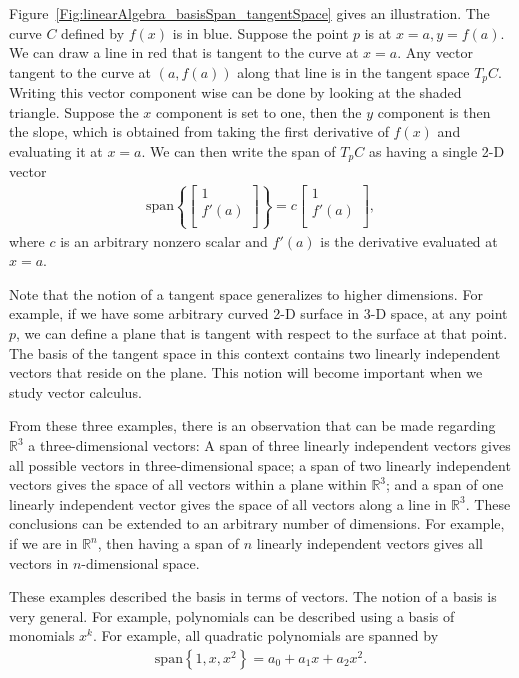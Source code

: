 Figure~\ref{Fig:linearAlgebra_basisSpan_tangentSpace} gives an illustration. The curve $C$ defined by $f(x)$ is in blue. Suppose the point $p$ is at $x = a, y = f(a)$. We can draw a line in red that is tangent to the curve at $x = a$. Any vector tangent to the curve at $(a,f(a))$ along that line is in the tangent space $T_p C$. Writing this vector component wise can be done by looking at the shaded triangle. Suppose the $x$ component is set to one, then the $y$ component is then the slope, which is obtained from taking the first derivative of $f(x)$ and evaluating it at $x = a$. We can then write the span of $T_p C$ as having a single 2-D vector
\begin{align}
  \text{span} \left\{ 
    \left[ \begin{array}{c} 1 \\  f'(a) \\ \end{array} \right] \right\}
  = c \left[ \begin{array}{c} 1 \\  f'(a) \\ \end{array} \right]  ,
\end{align}
where $c$ is an arbitrary nonzero scalar and $f'(a)$ is the derivative evaluated at $x = a$.

Note that the notion of a tangent space generalizes to higher dimensions. For example, if we have some arbitrary curved 2-D surface in 3-D space, at any point $p$, we can define a plane that is tangent with respect to the surface at that point. The basis of the tangent space in this context contains two linearly independent vectors that reside on the plane. This notion will become important when we study vector calculus.

From these three examples, there is an observation that can be made regarding $\mathbb{R}^3$ a three-dimensional vectors: A span of three linearly independent vectors gives all possible vectors in three-dimensional space; a span of two linearly independent vectors gives the space of all vectors within a plane within $\mathbb{R}^3$; and a span of one linearly independent vector gives the space of all vectors along a line in $\mathbb{R}^3$. These conclusions can be extended to an arbitrary number of dimensions. For example, if we are in $\mathbb{R}^n$, then having a span of $n$ linearly independent vectors gives all vectors in $n$-dimensional space.

These examples described the basis in terms of vectors. The notion of a basis is very general. For example, polynomials can be described using a basis of monomials $x^k$. For example, all quadratic polynomials are spanned by
\begin{align}
  \text{span} \left\{ 1, x, x^2 \right\}
  = a_0 + a_1 x + a_2 x^2 .
\end{align}

